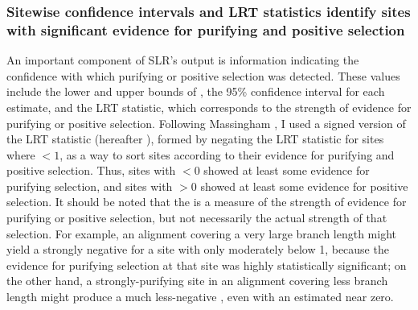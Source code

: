 \subsubsection{Sitewise confidence intervals and LRT statistics identify 
sites with significant evidence for purifying and positive selection}

An important component of SLR's output is \sw information indicating
the confidence with which purifying or positive selection was
detected. These values include the lower and upper bounds of \ci, the
95\% confidence interval for each \omgml estimate, and the LRT
statistic, which corresponds to the strength of evidence for purifying
or positive selection. Following Massingham
\citeyearpar{Massingham2005}, I used a signed version of the LRT
statistic (hereafter \slrt), formed by negating the LRT statistic for
sites where \omgml$<1$, as a way to sort sites according to their
evidence for purifying and positive selection. Thus, sites with
\slrt$<0$ showed at least some evidence for purifying selection, and
sites with \slrt$>0$ showed at least some evidence for positive
selection. It should be noted that the \slrt is a measure of the
strength of evidence for purifying or positive selection, but not
necessarily the actual strength of that selection. For example, an
alignment covering a very large branch length might yield a strongly
negative \slrt for a site with \omgml only moderately below 1, because
the evidence for purifying selection at that site was highly
statistically significant; on the other hand, a strongly-purifying
site in an alignment covering less branch length might produce a much
less-negative \slrt, even with an estimated \omgml near zero.


